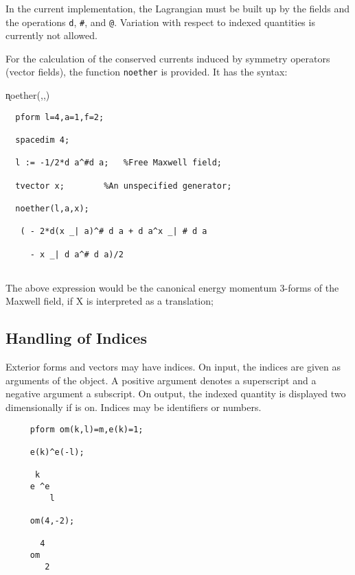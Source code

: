 In the current implementation, the Lagrangian must be built up by the
fields and the operations \texttt{d}, \texttt{\#}, and \texttt{@}. Variation
with respect to indexed quantities is currently not allowed.

For the calculation of the conserved currents induced by symmetry
operators (vector fields), the function \texttt{noether}\label{NOETHER}
\hypertarget{operator:NOETHER}{}
is provided.  It has the syntax:

\hspace*{2em}
\k{noether}(,,)

\example{}
\begin{verbatim}
  pform l=4,a=1,f=2;

  spacedim 4;

  l := -1/2*d a^#d a;   %Free Maxwell field;

  tvector x;        %An unspecified generator;

  noether(l,a,x);

   ( - 2*d(x _| a)^# d a + d a^x _| # d a

     - x _| d a^# d a)/2


\end{verbatim}

The above expression would be the canonical energy
momentum 3-forms of the Maxwell field, if X is interpreted
as a translation;



\subsection{Handling of Indices}
Exterior forms and vectors may have indices.  On input, the indices
are given as arguments of the object.  A positive argument denotes a
superscript and a negative argument a subscript.  On output, the
indexed quantity is displayed two dimensionally if  is on.
Indices may be identifiers or numbers.

\example{}

\begin{verbatim}
     pform om(k,l)=m,e(k)=1;

     e(k)^e(-l);

      k
     e ^e
         l

     om(4,-2);

       4
     om
        2
\end{verbatim}

